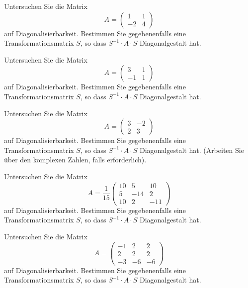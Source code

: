 \begin{aufgabe} Untersuchen Sie die Matrix
  	$$ A =  \left( \begin{matrix} 1 & 1 \\ -2 & 4 \end{matrix} \right) $$
auf Diagonalisierbarkeit. Bestimmen Sie gegebenenfalls eine Transformationsmatrix $S$, so dass $S^{-1} \cdot A \cdot S$ 
Diagonalgestalt hat.
\end{aufgabe}

\begin{aufgabe} Untersuchen Sie die Matrix
  	$$ A =  \left( \begin{matrix} 3 & 1 \\ -1 & 1 \end{matrix} \right) $$
auf Diagonalisierbarkeit. Bestimmen Sie gegebenenfalls eine Transformationsmatrix $S$, so dass $S^{-1} \cdot A \cdot S$ 
Diagonalgestalt hat.
\end{aufgabe}

\begin{aufgabe} Untersuchen Sie die Matrix
  	$$ A =  \left( \begin{matrix} 3 & -2 \\ 2 & 3 \end{matrix} \right) $$
auf Diagonalisierbarkeit. Bestimmen Sie gegebenenfalls eine Transformationsmatrix $S$, so dass $S^{-1} \cdot A \cdot S$ 
Diagonalgestalt hat. (Arbeiten Sie über den komplexen Zahlen, falls erforderlich).
\end{aufgabe}

\begin{aufgabe} Untersuchen Sie die Matrix
  	$$ A =  \frac {1}{15} \left( \begin{matrix} 10 & 5 & 10 \\ 5 & -14 & 2 \\ 10 & 2 & -11 \end{matrix} \right) $$
auf Diagonalisierbarkeit. Bestimmen Sie gegebenenfalls eine Transformationsmatrix $S$, 
so dass $S^{-1} \cdot A \cdot S$ Diagonalgestalt hat.
\end{aufgabe}

\begin{aufgabe} Untersuchen Sie die Matrix
  	$$ A =  \left( \begin{matrix} -1 & 2 & 2 \\ 2 & 2 & 2 \\ -3 & -6 & -6 \end{matrix} \right) $$
auf Diagonalisierbarkeit. Bestimmen Sie gegebenenfalls eine Transformationsmatrix $S$, 
so dass $S^{-1} \cdot A \cdot S$ Diagonalgestalt hat.
\end{aufgabe}

